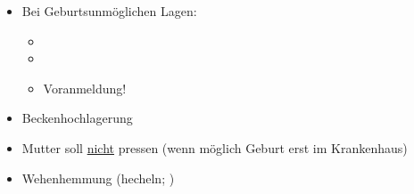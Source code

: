 \label{m:pathologische-geburtslagen}
\begin{itemize}
  \item Bei Geburtsunmöglichen Lagen:\begin{itemize}
    \item {}
    \item {}
    \item Voranmeldung!
  \end{itemize}
	\item Beckenhochlagerung
	\item Mutter soll \underline{nicht} pressen (wenn möglich Geburt erst im
	Krankenhaus)
	\item Wehenhemmung (hecheln; )
\end{itemize}
